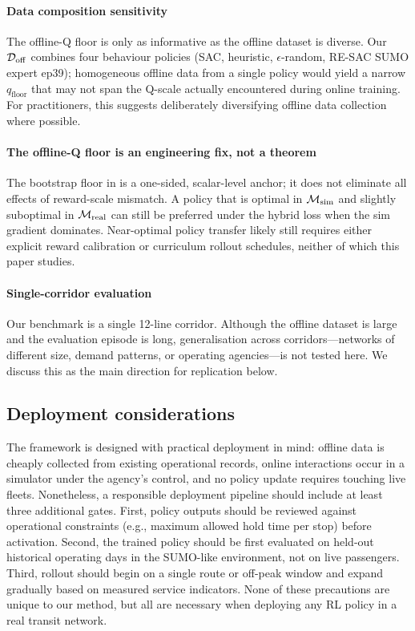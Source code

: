 \paragraph{Data composition sensitivity}
The offline-Q floor is only as informative as the offline dataset is diverse.
Our $\mathcal{D}_{\mathrm{off}}$ combines four behaviour policies (SAC, heuristic, $\epsilon$-random, RE-SAC SUMO expert ep39); homogeneous offline data from a single policy would yield a narrow $q_{\text{floor}}$ that may not span the Q-scale actually encountered during online training.
For practitioners, this suggests deliberately diversifying offline data collection where possible.

\paragraph{The offline-Q floor is an engineering fix, not a theorem}
The bootstrap floor in  is a one-sided, scalar-level anchor; it does not eliminate all effects of reward-scale mismatch.
A policy that is optimal in $\mathcal{M}_{\mathrm{sim}}$ and slightly suboptimal in $\mathcal{M}_{\mathrm{real}}$ can still be preferred under the hybrid loss when the sim gradient dominates.
Near-optimal policy transfer likely still requires either explicit reward calibration \citep{hanna2017grounded} or curriculum rollout schedules, neither of which this paper studies.

\paragraph{Single-corridor evaluation}
Our benchmark is a single 12-line corridor.
Although the offline dataset is large and the evaluation episode is long, generalisation across corridors---networks of different size, demand patterns, or operating agencies---is not tested here.
We discuss this as the main direction for replication below.

\subsection{Deployment considerations}

The framework is designed with practical deployment in mind: offline data is cheaply collected from existing operational records, online interactions occur in a simulator under the agency's control, and no policy update requires touching live fleets.
Nonetheless, a responsible deployment pipeline should include at least three additional gates.
First, policy outputs should be reviewed against operational constraints (e.g., maximum allowed hold time per stop) before activation.
Second, the trained policy should be first evaluated on held-out historical operating days in the SUMO-like environment, not on live passengers.
Third, rollout should begin on a single route or off-peak window and expand gradually based on measured service indicators.
None of these precautions are unique to our method, but all are necessary when deploying any RL policy in a real transit network.

